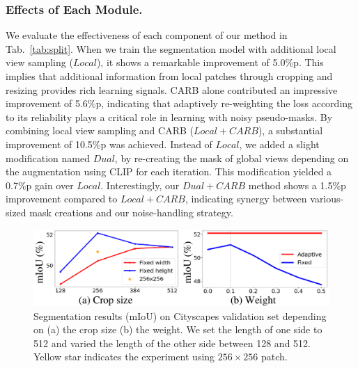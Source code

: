 \documentclass[letterpaper]{article} %
\begin{document}
\subsubsection{Effects of Each Module.} We evaluate the effectiveness of each component of our method in Tab.~\ref{tab:split}. When we train the segmentation model with additional local view sampling ($Local$), it shows a remarkable improvement of 5.0\%p. This implies that additional information from local patches through cropping and resizing provides rich learning signals. CARB alone contributed an impressive improvement of 5.6\%p, indicating that adaptively re-weighting the loss according to its reliability plays a critical role in learning with noisy pseudo-masks. By combining local view sampling and CARB ($Local + CARB$), a substantial improvement of 10.5\%p was achieved. Instead of $Local$, we added a slight modification named $Dual$, by re-creating the mask of global views depending on the augmentation using CLIP for each iteration. This modification yielded a 0.7\%p gain over $Local$. Interestingly, our $Dual+CARB$ method shows a 1.5\%p improvement compared to $Local + CARB$, indicating synergy between various-sized mask creations and our noise-handling strategy.

\begin{figure}[t]
\begin{center}
\includegraphics[width=\linewidth]{figures/fig_ablation.pdf}
\end{center}
\caption{Segmentation results (mIoU) on Cityscapes validation set depending on (a) the crop size (b) the weight. We set the length of one side to 512 and varied the length of the other side between 128 and 512. Yellow star indicates the experiment using $256 \times 256$ patch.}
\label{fig:ablation}
\end{figure}
\end{document}

